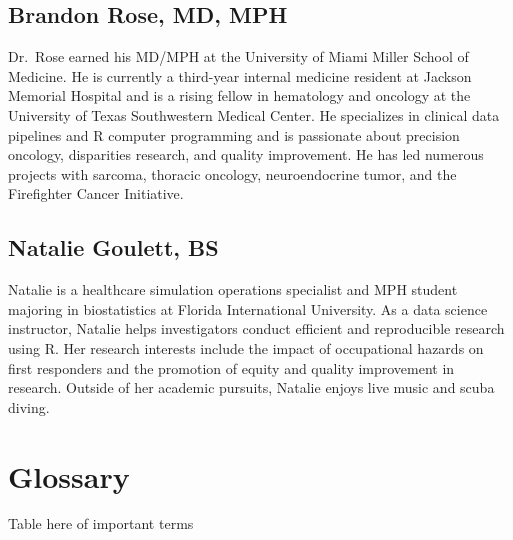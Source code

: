 \documentclass[
]{book}
\begin{document}
\section{Brandon Rose, MD, MPH}\label{brandon-rose-md-mph}

Dr.~Rose earned his MD/MPH at the University of Miami Miller School of Medicine. He is currently a third-year internal medicine resident at Jackson Memorial Hospital and is a rising fellow in hematology and oncology at the University of Texas Southwestern Medical Center. He specializes in clinical data pipelines and R computer programming and is passionate about precision oncology, disparities research, and quality improvement. He has led numerous projects with sarcoma, thoracic oncology, neuroendocrine tumor, and the Firefighter Cancer Initiative.

\section{Natalie Goulett, BS}\label{natalie-goulett-bs}

Natalie is a healthcare simulation operations specialist and MPH student majoring in biostatistics at Florida International University. As a data science instructor, Natalie helps investigators conduct efficient and reproducible research using R. Her research interests include the impact of occupational hazards on first responders and the promotion of equity and quality improvement in research. Outside of her academic pursuits, Natalie enjoys live music and scuba diving.

\section{}\label{section}

\chapter{Glossary}\label{glossary}

Table here of important terms

  
\end{document}
